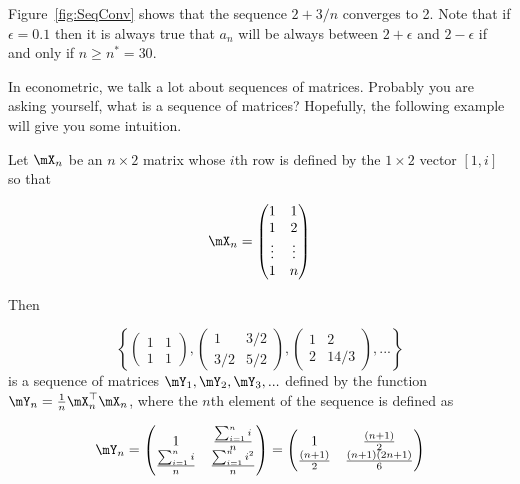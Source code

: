 \documentclass[english,12pt]{book}\usepackage[]{graphicx}\usepackage[]{xcolor}
\begin{document}
Figure~\ref{fig:SeqConv} shows that the sequence $2 + 3/n$ converges to 2. Note that if $\epsilon = 0.1$ then it is always true that $a_n$ will be always between $2 + \epsilon$ and $2 - \epsilon$ if and only if $n \geq n^*= 30$.

In econometric, we talk a lot about sequences of matrices. Probably you are asking yourself, what is a sequence of matrices? Hopefully, the following example will give you some intuition. 

\begin{example}\label{example:sequence_matrix}
Let $\mX_n$ be an $n\times 2$ matrix whose $i$th row is defined by the $1\times 2$ vector $\left[1, i\right]$ so that

\begin{equation*}
\mX_n = \begin{pmatrix}
  1 & 1 \\
  1 & 2 \\
  \vdots & \vdots\\
  1 & n
\end{pmatrix}
\end{equation*}

Then

\begin{equation*}
\left\lbrace \begin{pmatrix}
1 & 1\\
1 & 1
\end{pmatrix},
\begin{pmatrix}
  1 & 3/2 \\
  3/2 & 5/2
\end{pmatrix},
\begin{pmatrix}
1 & 2 \\
2 & 14/3
\end{pmatrix}, ...
\right\rbrace
\end{equation*}
%
is a sequence of matrices $\mY_1, \mY_2, \mY_3,...$ defined by the function $\mY_n = \frac{1}{n}\mX_n^\top\mX_n$, where the $n$th element of the sequence is defined as

\begin{equation*}
\mY_n = \begin{pmatrix}
1 & \frac{\sum_{i = 1}^n i}{n} \\
\frac{\sum_{i = 1}^n i}{n} & \frac{\sum_{i = 1}^n i^2}{n}
\end{pmatrix} = 
\begin{pmatrix}
1 & \frac{(n + 1)}{2} \\
\frac{(n + 1)}{2}& \frac{(n +1)(2n +1)}{6}
\end{pmatrix}
\end{equation*}
\end{example}
\end{document}
